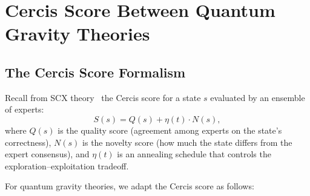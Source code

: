 \documentclass[12pt,a4paper]{article}
\theoremstyle{remark}
\newcommand{\SCX}{\textsf{SCX}}
\newcommand{\Cercis}{\textsf{Cercis}}
\begin{document}
\section{Cercis Score Between Quantum Gravity Theories}
\label{sec:cercis}

\subsection{The Cercis Score Formalism}

Recall from \SCX{} theory~\cite{scx_theory} the \Cercis{} score for a state $s$ evaluated by an ensemble of experts:
\begin{equation}
  \label{eq:cercis}
  S(s) = Q(s) + \eta(t) \cdot N(s),
\end{equation}
where $Q(s)$ is the quality score (agreement among experts on the state's correctness), $N(s)$ is the novelty score (how much the state differs from the expert consensus), and $\eta(t)$ is an annealing schedule that controls the exploration--exploitation tradeoff.

For quantum gravity theories, we adapt the \Cercis{} score as follows:
\end{document}
